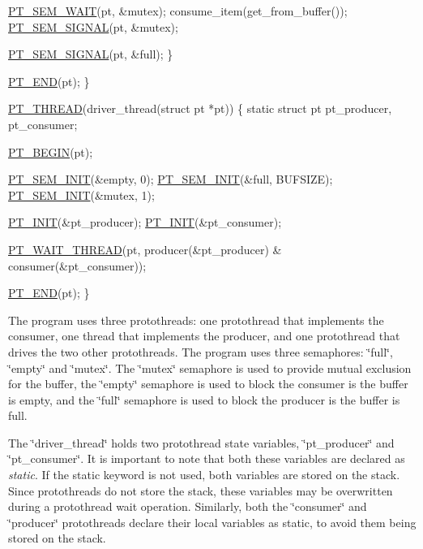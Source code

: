 \begin{DoxyCode}
    \hyperlink{group__ptsem_ga386ff87a52a840512906f2940e229e2e}{PT\_SEM\_WAIT}(pt, &mutex);    
    consume\_item(get\_from\_buffer());    
    \hyperlink{group__ptsem_ga1eaaf4d9d75e24582acc6440d7085f19}{PT\_SEM\_SIGNAL}(pt, &mutex);
    
    \hyperlink{group__ptsem_ga1eaaf4d9d75e24582acc6440d7085f19}{PT\_SEM\_SIGNAL}(pt, &full);
  \}

  \hyperlink{group__pt_ga7b04a0035bef29d905496c23bae066d2}{PT\_END}(pt);
\}

\hyperlink{group__pt_ga3d4c8bd4aada659eb34f5d2ffd3e7901}{PT\_THREAD}(driver\_thread(\textcolor{keyword}{struct} pt *pt))
\{
  \textcolor{keyword}{static} \textcolor{keyword}{struct }pt pt\_producer, pt\_consumer;

  \hyperlink{group__pt_ga2ffbb9e554e08a343ae2f9de4bedfdfc}{PT\_BEGIN}(pt);
  
  \hyperlink{group__ptsem_gad7089c5dc86f12019f0361d82a75b04b}{PT\_SEM\_INIT}(&empty, 0);
  \hyperlink{group__ptsem_gad7089c5dc86f12019f0361d82a75b04b}{PT\_SEM\_INIT}(&full, BUFSIZE);
  \hyperlink{group__ptsem_gad7089c5dc86f12019f0361d82a75b04b}{PT\_SEM\_INIT}(&mutex, 1);

  \hyperlink{group__pt_gae6bae7dc0225468c8a5ac269df549892}{PT\_INIT}(&pt\_producer);
  \hyperlink{group__pt_gae6bae7dc0225468c8a5ac269df549892}{PT\_INIT}(&pt\_consumer);

  \hyperlink{group__pt_ga2f8f70c30b9ee08a103fbd69a4365c4c}{PT\_WAIT\_THREAD}(pt, producer(&pt\_producer) &
             consumer(&pt\_consumer));

  \hyperlink{group__pt_ga7b04a0035bef29d905496c23bae066d2}{PT\_END}(pt);
\}
\end{DoxyCode}


The program uses three protothreads\-: one protothread that implements the consumer, one thread that implements the producer, and one protothread that drives the two other protothreads. The program uses three semaphores\-: \char`\"{}full\char`\"{}, \char`\"{}empty\char`\"{} and \char`\"{}mutex\char`\"{}. The \char`\"{}mutex\char`\"{} semaphore is used to provide mutual exclusion for the buffer, the \char`\"{}empty\char`\"{} semaphore is used to block the consumer is the buffer is empty, and the \char`\"{}full\char`\"{} semaphore is used to block the producer is the buffer is full.

The \char`\"{}driver\-\_\-thread\char`\"{} holds two protothread state variables, \char`\"{}pt\-\_\-producer\char`\"{} and \char`\"{}pt\-\_\-consumer\char`\"{}. It is important to note that both these variables are declared as {\itshape static}. If the static keyword is not used, both variables are stored on the stack. Since protothreads do not store the stack, these variables may be overwritten during a protothread wait operation. Similarly, both the \char`\"{}consumer\char`\"{} and \char`\"{}producer\char`\"{} protothreads declare their local variables as static, to avoid them being stored on the stack. 

